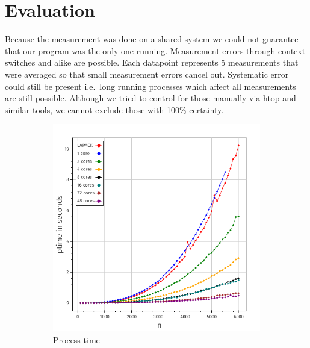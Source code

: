 \documentclass[a4paper,final,ngerman,english]{article}
\begin{document}
\section{Evaluation}
Because the measurement was done on a shared system
we could not guarantee that our program was the only one running.
Measurement errors through context switches and alike are possible.
Each datapoint represents 5 measurements that were averaged so that small measurement errors cancel out.
Systematic error could still be present i.e.\ long running processes which affect all measurements
are still possible. Although we tried to control for those manually via htop and similar tools, we cannot exclude
those with 100\% certainty.

\begin{figure}[h!]
	\centering
	\begin{subfigure}{0.4\textwidth}
		\includegraphics[width=\textwidth]{ptime}
		\caption{Process time}
\label{fig:runtime}
	\end{subfigure}
	\begin{subfigure}{0.4\textwidth}

\end{subfigure}
\end{figure}
\end{document}
